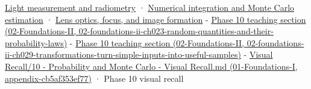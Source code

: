 \hyperref[03-visual-computing-i-ch004-light-measurement-and-radiometry]{Light measurement and radiometry} · \hyperref[03-visual-computing-i-ch012-numerical-integration-and-monte-carlo-estimation]{Numerical integration and Monte Carlo estimation} · \hyperref[03-visual-computing-i-ch003-lens-optics-focus-and-image-formation]{Lens optics, focus, and image formation} - \href{../02-Foundations-II/main.pdf\#nameddest=02-foundations-ii-ch023-random-quantities-and-their-probability-laws}{Phase 10 teaching section (02-Foundations-II, 02-foundations-ii-ch023-random-quantities-and-their-probability-laws)} - \href{../02-Foundations-II/main.pdf\#nameddest=02-foundations-ii-ch029-transformations-turn-simple-inputs-into-useful-samples}{Phase 10 teaching section (02-Foundations-II, 02-foundations-ii-ch029-transformations-turn-simple-inputs-into-useful-samples)} - \href{../01-Foundations-I/main.pdf\#nameddest=appendix-cb5af353ef77}{Visual Recall/10 - Probability and Monte Carlo - Visual Recall.md (01-Foundations-I, appendix-cb5af353ef77)} · Phase 10 visual recall
